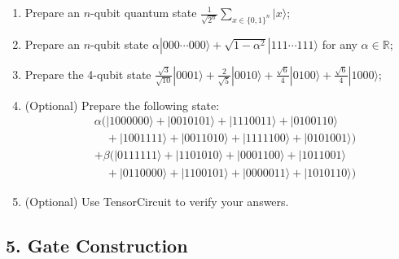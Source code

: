 \documentclass{ctexart}
\newcommand{\ket}[1]{|#1\rangle}
\begin{document}
\begin{enumerate}
    \item[(a)] Prepare an $n$-qubit quantum state $\frac{1}{\sqrt{2^n}} \sum_{x \in \{0,1\}^n} \ket{x}$;
    \item[(b)] Prepare an $n$-qubit state $\alpha\ket{000\cdots000} + \sqrt{1-\alpha^2}\ket{111\cdots111}$ for any $\alpha \in \mathbb{R}$;
    \item[(c)] Prepare the 4-qubit state $\frac{\sqrt{3}}{\sqrt{10}}\ket{0001} + \frac{2}{\sqrt{5}}\ket{0010} + \frac{\sqrt{6}}{4}\ket{0100} + \frac{\sqrt{6}}{4}\ket{1000}$;
    \item[(d)] (Optional) Prepare the following state:
    \begin{align*}
        &\alpha(\ket{1000000}+\ket{0010101}+\ket{1110011}+\ket{0100110} \\
        &\quad +\ket{1001111}+\ket{0011010}+\ket{1111100}+\ket{0101001}) \\
        &+\beta(\ket{0111111}+\ket{1101010}+\ket{0001100}+\ket{1011001} \\
        &\quad +\ket{0110000}+\ket{1100101}+\ket{0000011}+\ket{1010110})
    \end{align*}
    \item[(e)] (Optional) Use TensorCircuit to verify your answers.
\end{enumerate}

\subsection*{5. Gate Construction}
\end{document}
